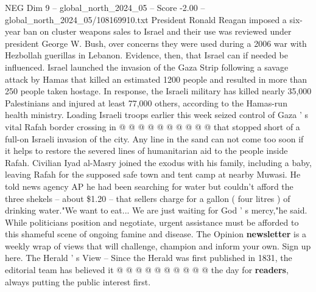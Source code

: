 \begin{textsample}{NEG Dim 9 – global\_north\_2024\_05 – Score -2.00 – global\_north\_2024\_05/108169910.txt}
President Ronald Reagan imposed a six-year ban on cluster weapons sales to Israel and their use was reviewed under president George W.
Bush, over concerns they were used during a 2006 war with Hezbollah guerillas in Lebanon.
Evidence, then, that Israel can if needed be influenced.
Israel launched the invasion of the Gaza Strip following a savage attack by Hamas that killed an estimated 1200 people and resulted in more than 250 people taken hostage.
In response, the Israeli military has killed nearly 35,000 Palestinians and injured at least 77,000 others, according to the Hamas-run health ministry.
Loading Israeli troops earlier this week seized control of Gaza ' s vital Rafah border crossing in @ @ @ @ @ @ @ @ @ @ that stopped short of a full-on Israeli invasion of the city.
Any line in the sand can not come too soon if it helps to restore the severed lines of humanitarian aid to the people inside Rafah.
Civilian Iyad al-Masry joined the exodus with his family, including a baby, leaving Rafah for the supposed safe town and tent camp at nearby Muwasi.
He told news agency AP he had been searching for water but couldn't afford the three shekels -- about \$1.20 -- that sellers charge for a gallon ( four litres ) of drinking water."We want to eat...
We are just waiting for God ' s mercy,"he said.
While politicians position and negotiate, urgent assistance must be afforded to this shameful scene of ongoing famine and disease.
The Opinion \textbf{newsletter} is a weekly wrap of views that will challenge, champion and inform your own.
Sign up here.
The Herald ' s View -- Since the Herald was first published in 1831, the editorial team has believed it @ @ @ @ @ @ @ @ @ @ the day for \textbf{readers}, always putting the public interest first.

\end{textsample}
